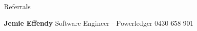 \documentclass{resume} %
\begin{document}
	
	
	\begin{rSection}{Referrals} 
		\vspace{-1.25em}
		\item \textbf{Jemie Effendy} {Software Engineer - Powerledger} 
			\hfill 
			 0430 658 901
	\end{rSection}
\end{document}

